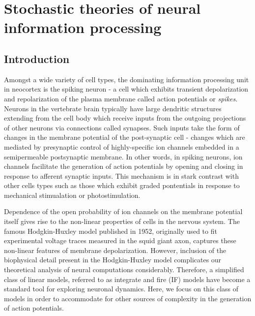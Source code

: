 \documentclass{ucetd}
\begin{document}
\mainmatter

\chapter{Stochastic theories of neural information processing}

\section{Introduction}

Amongst a wide variety of cell types, the dominating information processing unit in neocortex is the spiking neuron - a  cell which exhibits transient depolarization and repolarization of the plasma membrane called action potentials or \emph{spikes}. Neurons in the vertebrate brain typically have large dendritic structures extending from the cell body which receive inputs from the outgoing projections of other neurons via connections called synapses. Such inputs take the form of changes in the  membrane potential of the post-synaptic cell - changes which are mediated by presynaptic control of highly-specific ion channels embedded in a semipermeable postsynaptic membrane. In other words, in spiking neurons, ion channels facilitate the generation of action potentials by opening and closing in response to afferent synaptic inputs. This mechanism is in stark contrast with other cells types such as those which exhibit graded pontentials in response to mechanical stimualation or photostimulation. 

Dependence of the open probability of ion channels on the membrane potential itself gives rise to the non-linear properties of cells in the nervous system. The famous Hodgkin-Huxley model published in 1952, originally used to fit experimental voltage traces measured in the squid giant axon, captures these non-linear features of membrane depolarization. However, inclusion of the biophysical detail present in the Hodgkin-Huxley model complicates our theoretical analysis of neural computations considerably. Therefore, a simplified class of linear models, referred to as integrate and fire (IF) models have become a standard tool for exploring neuronal dynamics. Here, we focus on this class of models in order to accommodate for other sources of complexity in the generation of action potentials.
\end{document}
